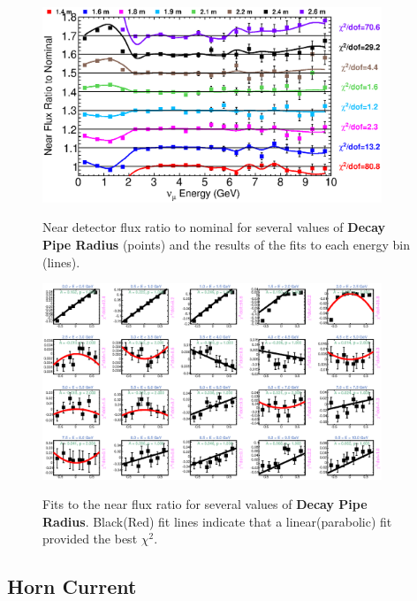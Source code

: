 \begin{figure}[ht]
  \begin{center}
    {\includegraphics[width=4.0in]{figures/DecayPipeRadius_near_summary.eps}}
  \end{center}
\caption{ Near detector flux ratio to nominal for several values of {\bf Decay Pipe Radius} (points) and the results of the fits to each energy bin (lines).}
\end{figure}

\begin{figure}[hb]
  \begin{center}
    {\includegraphics[width=4.0in]{figures/DecayPipeRadius_near_fits.eps}}
  \end{center}
\caption{ Fits to the near flux ratio for several values of {\bf Decay Pipe Radius}. Black(Red) fit lines indicate that a linear(parabolic) fit provided the best $\chi^2$. }
\end{figure}

\clearpage
\subsection{Horn Current}


